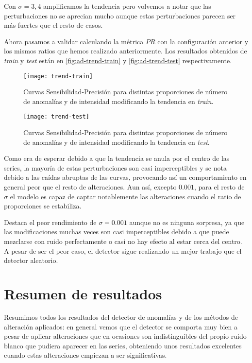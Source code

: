 Con $\sigma = 3, 4$ amplificamos la tendencia pero volvemos a notar que las perturbaciones no se aprecian mucho aunque estas perturbaciones parecen ser más fuertes que el resto de casos.

Ahora pasamos a validar calculando la métrica $PR$ con la configuración anterior y los mismos ratios que hemos realizado anteriormente. Los resultados obtenidos de \emph{train} y \emph{test} están en \autoref{fig:ad-trend-train} y \autoref{fig:ad-trend-test} respectivamente.

\begin{figure}[htpb]
  \centering
  \texttt{[image: trend-train]}
  \caption{Curvas Sensibilidad-Precisión para distintas proporciones de número de anomalías y de intensidad modificando la tendencia en \emph{train}.}
  \label{fig:ad-trend-train}
\end{figure}

\begin{figure}[htpb]
  \centering
  \texttt{[image: trend-test]}
  \caption{Curvas Sensibilidad-Precisión para distintas proporciones de número de anomalías y de intensidad modificando la tendencia en \emph{test}.}
  \label{fig:ad-trend-test}
\end{figure}

Como era de esperar debido a que la tendencia se anula por el centro de las series, la mayoría de estas perturbaciones son casi imperceptibles y se nota debido a las caídas abruptas de las curvas, provocando así un comportamiento en general peor que el resto de alteraciones. Aun así, excepto $0.001$, para el resto de $\sigma$ el modelo es capaz de captar notablemente las alteraciones cuando el ratio de proporciones se estabiliza.

Destaca el peor rendimiento de $\sigma = 0.001$ aunque no es ninguna sorpresa, ya que las modificaciones muchas veces son casi imperceptibles debido a que puede mezclarse con ruido perfectamente o casi no hay efecto al estar cerca del centro. A pesar de ser el peor caso, el detector sigue realizando un mejor trabajo que el detector aleatorio.

\section{Resumen de resultados}

Resumimos todos los resultados del detector de anomalías y de los métodos de alteración aplicados: en general vemos que el detector se comporta muy bien a pesar de aplicar alteraciones que en ocasiones son indistinguibles del propio ruido blanco que pudiera aparecer en las series, obteniendo unos resultados excelentes cuando estas alteraciones empiezan a ser significativas.

